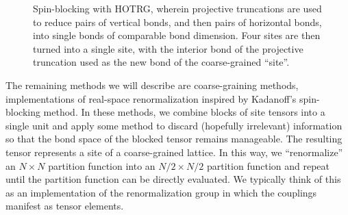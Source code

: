 \documentclass[aps,prb,letterpaper,superscriptaddress,twocolumn,showpacs,floatfix,10pt]{revtex4-1}
\begin{document}
\begin{figure}
\caption{Spin-blocking with HOTRG, wherein projective truncations are used to
reduce pairs of vertical bonds, and then pairs of horizontal bonds, into single
bonds of comparable bond dimension. Four sites are then turned into a single
site, with the interior bond of the projective truncation used as the new bond
of the coarse-grained ``site''.}
\label{fig:HOTRG}
\end{figure}
The remaining methods we will describe are coarse-graining methods,
implementations of real-space renormalization inspired by Kadanoff's
spin-blocking method. In these methods, we combine blocks of site tensors
into a single unit and apply some method to discard (hopefully irrelevant)
information so that the bond space of the blocked tensor remains manageable.
The resulting tensor represents a site of a coarse-grained lattice.
In this way, we ``renormalize'' an $N\times N$ partition function
into an $N/2\times N/2$ partition function and repeat until the
partition function can be directly evaluated. We typically think of this as
an implementation of the renormalization group in which the couplings
manifest as tensor elements.
\end{document}
